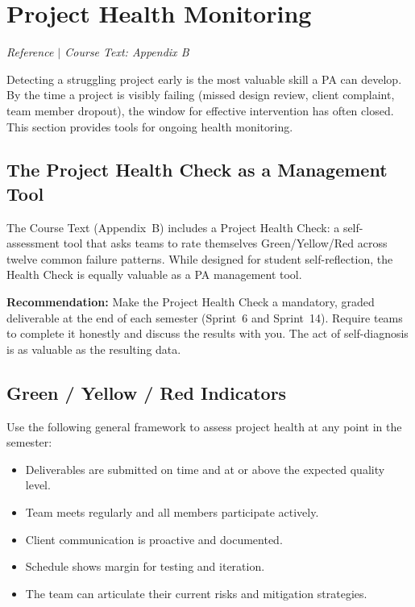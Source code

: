 \section{Project Health Monitoring}
\textit{Reference $|$ Course Text: Appendix B}

Detecting a struggling project early is the most valuable skill a PA can develop. By the time a project is visibly failing (missed design review, client complaint, team member dropout), the window for effective intervention has often closed. This section provides tools for ongoing health monitoring.

\subsection{The Project Health Check as a Management Tool}

The Course Text (Appendix~B) includes a Project Health Check: a self-assessment tool that asks teams to rate themselves Green/Yellow/Red across twelve common failure patterns. While designed for student self-reflection, the Health Check is equally valuable as a PA management tool.

\begin{paaction}
\textbf{Recommendation:} Make the Project Health Check a mandatory, graded deliverable at the end of each semester (Sprint~6 and Sprint~14). Require teams to complete it honestly and discuss the results with you. The act of self-diagnosis is as valuable as the resulting data.
\end{paaction}

\subsection{Green / Yellow / Red Indicators}

Use the following general framework to assess project health at any point in the semester:

\begin{faqbox}
\begin{itemize}[nosep,leftmargin=1.5em]
\item Deliverables are submitted on time and at or above the expected quality level.
\item Team meets regularly and all members participate actively.
\item Client communication is proactive and documented.
\item Schedule shows margin for testing and iteration.
\item The team can articulate their current risks and mitigation strategies.
\end{itemize}
\end{faqbox}

